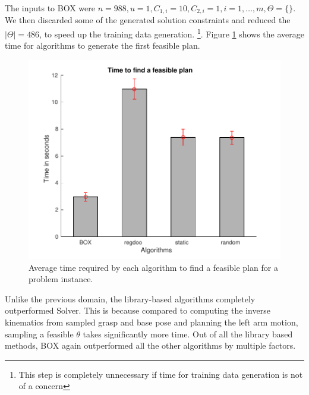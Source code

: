 The inputs to BOX were 
$n=988,u=1,C_{1,i}=10,C_{2,i}=1, i=1,\ldots,m, \Theta=\{\}$.  We then
 discarded some of the generated solution constraints and reduced the
 $|\Theta|=486$, to speed up the training data generation. 
\footnote{This step is completely unnecessary if time for training data
 generation is not of a concern}. Figure \ref{fig:ff_bar_pick_base} 
shows the average time for algorithms to generate the first feasible plan.
\begin{figure}[htb]
\centering
\includegraphics[scale=0.5]{./figures/pick-place_feas_plot.pdf}
\caption{ Average time required by each algorithm to find a feasible plan for a problem instance.}
\label{fig:ff_bar_pick_base}
\end{figure} 
Unlike the previous domain, the library-based algorithms completely
outperformed Solver. This is because compared to computing the
inverse kinematics from sampled grasp and base pose and planning 
the left arm motion, sampling a feasible $\theta$ takes 
significantly more time. Out of all the library based methods,
 BOX again outperformed all the other
algorithms by multiple factors.

